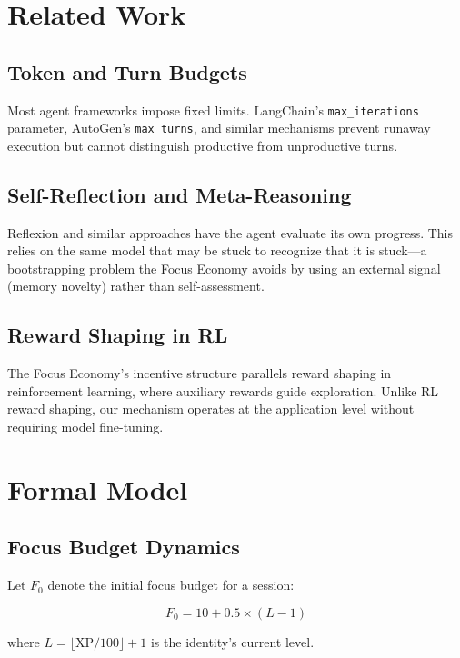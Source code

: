 \documentclass[man,12pt,floatsintext]{apa7}
\begin{document}
\section{Related Work}

\subsection{Token and Turn Budgets}

Most agent frameworks impose fixed limits. LangChain's \texttt{max\_iterations}
parameter, AutoGen's \texttt{max\_turns}, and similar mechanisms prevent runaway
execution but cannot distinguish productive from unproductive turns.

\subsection{Self-Reflection and Meta-Reasoning}

Reflexion \parencite{} and similar approaches have the agent evaluate its own progress.
This relies on the same model that may be stuck to recognize that it is stuck---a
bootstrapping problem the Focus Economy avoids by using an external signal (memory
novelty) rather than self-assessment.

\subsection{Reward Shaping in RL}

The Focus Economy's incentive structure parallels reward shaping in reinforcement learning,
where auxiliary rewards guide exploration. Unlike RL reward shaping, our mechanism operates
at the application level without requiring model fine-tuning.

\section{Formal Model}

\subsection{Focus Budget Dynamics}

Let $F_0$ denote the initial focus budget for a session:

\begin{equation}
  F_0 = 10 + 0.5 \times (L - 1)
\end{equation}

where $L = \lfloor \text{XP} / 100 \rfloor + 1$ is the identity's current level.
\end{document}
